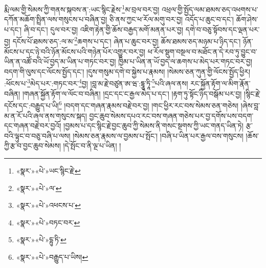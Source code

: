 རྨི་ལམ་གྱི་སེམས་ཀྱི་གནས་སྐབས་ན་:ཡང་སྙིང་རྗེས་\footnote{«སྣར་»«པེ་»ཡང་སྙིང་རྗེ་}མ་བྲལ་བར་བྱ། འཕྲལ་གྱི་སྤྱོད་ལམ་ཐམས་ཅད་འཕགས་པ་དཀོན་མཆོག་སྤྲིན་ལས་གསུངས་པ་བཞིན་བྱ། ཅི་ནས་ཀྱང་ཕ་རོལ་མགུ་བར་བྱ། འདོད་པ་ཆུང་བ་དང་། ཆོག་ཤེས་པ་དང་། ཞི་བ་དང་། དུལ་བར་བྱ། འཇིག་རྟེན་གྱི་ཆོས་བརྒྱད་མགོ་མནན་པར་བྱ། དགེ་བ་བཅུ་སྟོབས་དང་ལྡན་པར་བྱ། དངོས་པོ་ཐམས་ཅད་:ལ་མ་\footnote{«སྣར་»«པེ་»ལ་}ཆགས་པ་དང་། ཞེན་པ་ཆུང་བར་བྱ། ཆོས་ཐམས་ཅད་མཉམ་པ་ཉིད་དང་། ཉོན་མོངས་པ་དང་ཉེ་བའི་ཉོན་མོངས་པའི་གཉེན་པོར་འགྱུར་བར་བྱ། ཕ་རོལ་སྡུག་བསྔལ་བ་མཐོང་ན་དེ་རབ་ཏུ་བྱུང་བ་ཡིན་ན་འཚོ་བའི་ཡོ་བྱད་མ་ཡིན་པ་གཏང་བར་བྱ། ཁྱིམ་པ་ཡིན་ན་ཡོ་བྱད་ལ་ཆགས་པ་མེད་པར་གཏང་བར་བྱ། བདག་གི་ལུས་དང་ལོངས་སྤྱོད་དང་། །དུས་གསུམ་དགེ་བ་སྐྱེས་པ་རྣམས། །སེམས་ཅན་ཀུན་གྱི་ལོངས་སྤྱོད་ཕྱིར། :ཕོངས་པ་\footnote{«སྣར་»«པེ་»འཕངས་པ་}མེད་པར་:གཏང་བར་\footnote{«སྣར་»«པེ་»བཏང་བར་}བྱ། །བླ་མ་རྗེ་བཙུན་ཨ་ཝ་:དྷཱུ་ཏཱི་\footnote{«སྣར་»«པེ་»དྷུ་ཏི་}པའི་ཞལ་ནས། རང་སྐྱོན་རྟོག་ལ་མིག་རྣོན་བཞིན། །གཞན་སྐྱོན་རྟོག་ལ་ལོང་བ་བཞིན། །དྲང་དང་ང་རྒྱལ་མེད་པ་དང་། །རྟག་ཏུ་སྟོང་ཉིད་བསྒོམ་པར་བྱ། །སྙིང་རྗེ་དངོས་དང་:བརྒྱུད་པ་ཡི།\footnote{«སྣར་»«པེ་»བརྒྱུད་པ་ཡིས།} །བདག་དང་གཞན་རྣམས་བརྗེ་བར་བྱ། །གང་ཕྱིར་རང་བས་སེམས་ཅན་གཅེས། །ཞེས་བླ་མ་ན་རོ་པའི་ཞལ་ནས་གསུངས་སྐད། བྱང་ཆུབ་སེམས་དཔའ་རང་བས་གཞན་གཅེས་པར་བྱ་དགོས་པས་བདག་དང་གཞན་བརྗེ་བར་བྱའོ། །བྱམས་པ་དང་སྙིང་རྗེ་བྱང་ཆུབ་ཀྱི་སེམས་ནི་གསང་སྔགས་ཀྱི་ཡང་གནད་ཡིན་ཏེ། རྩ་བའི་ལྟུང་བ་བཅུ་བཞི་པ་ལས། །སེམས་ཅན་རྣམས་ལ་བྱམས་པ་སྤོང་། །བཞི་པ་ཡིན་པར་རྒྱལ་བས་གསུངས། །ཆོས་ཀྱི་རྩ་བ་བྱང་ཆུབ་སེམས། །དེ་སྤོང་བ་ནི་ལྔ་པ་ཡིན། །

